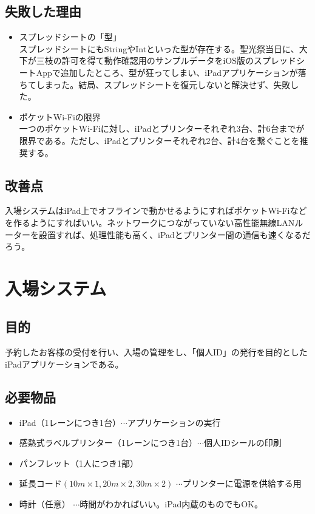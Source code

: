 \documentclass[dvipdfmx,jb5]{jreport}
\begin{document}
\subsection{失敗した理由}
\begin{itemize}
      \item スプレッドシートの「型」\\
            スプレッドシートにもStringやIntといった型が存在する。聖光祭当日に、大下が三枝の許可を得て動作確認用のサンプルデータをiOS版のスプレッドシートAppで追加したところ、型が狂ってしまい、iPadアプリケーションが落ちてしまった。結局、スプレッドシートを復元しないと解決せず、失敗した。
      \item ポケットWi-Fiの限界\\
            一つのポケットWi-Fiに対し、iPadとプリンターそれぞれ3台、計6台までが限界である。ただし、iPadとプリンターそれぞれ2台、計4台を繋ぐことを推奨する。
\end{itemize}

\subsection{改善点}
入場システムはiPad上でオフラインで動かせるようにすればポケットWi-Fiなどを作るようにすればいい。ネットワークにつながっていない高性能無線LANルーターを設置すれば、処理性能も高く、iPadとプリンター間の通信も速くなるだろう。
\section{入場システム}
\subsection{目的}
予約したお客様の受付を行い、入場の管理をし、「個人ID」の発行を目的としたiPadアプリケーションである。
\subsection{必要物品}
\begin{itemize}
      \item iPad（1レーンにつき1台）$\cdots$アプリケーションの実行
      \item 感熱式ラベルプリンター（1レーンにつき1台）$\cdots$個人IDシールの印刷
      \item パンフレット（1人につき1部）
      \item 延長コード$(10m\times1,20m\times2,30m\times2)$ $\cdots$プリンターに電源を供給する用
      \item 時計（任意） $\cdots$時間がわかればいい。iPad内蔵のものでもOK。
\end{itemize}
\end{document}
